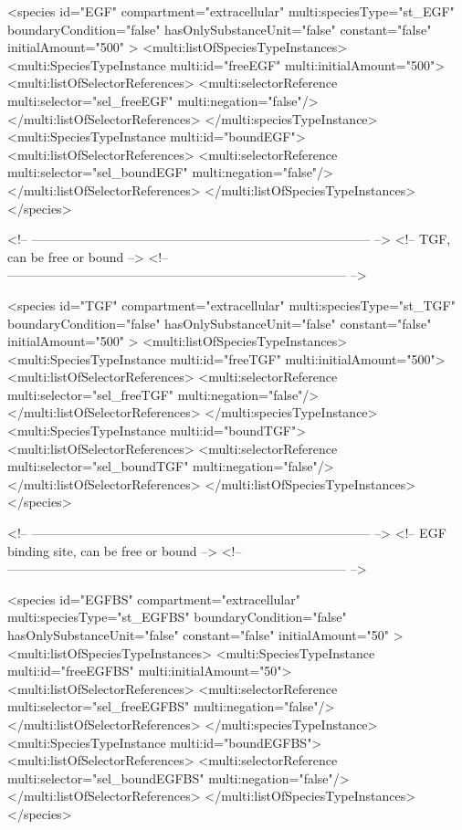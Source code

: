 \begin{example}
      <species id="EGF" compartment="extracellular" multi:speciesType="st_EGF"
               boundaryCondition="false" hasOnlySubstanceUnit="false" 
               constant="false" initialAmount="500" >
        <multi:listOfSpeciesTypeInstances>
          <multi:SpeciesTypeInstance multi:id="freeEGF" multi:initialAmount="500">
            <multi:listOfSelectorReferences>
              <multi:selectorReference multi:selector="sel_freeEGF" multi:negation="false"/>
            </multi:listOfSelectorReferences>
          </multi:speciesTypeInstance>
          <multi:SpeciesTypeInstance multi:id="boundEGF">
            <multi:listOfSelectorReferences>
              <multi:selectorReference multi:selector="sel_boundEGF" multi:negation="false"/>
            </multi:listOfSelectorReferences>
        </multi:listOfSpeciesTypeInstances>
      </species>

<!-- -------------------------------------------------------------------------------- -->
<!-- TGF, can be free or bound                                                        -->
<!-- -------------------------------------------------------------------------------- -->

     <species id="TGF" compartment="extracellular" multi:speciesType="st_TGF"
               boundaryCondition="false" hasOnlySubstanceUnit="false" 
               constant="false" initialAmount="500" >
        <multi:listOfSpeciesTypeInstances>
          <multi:SpeciesTypeInstance multi:id="freeTGF" multi:initialAmount="500">
            <multi:listOfSelectorReferences>
              <multi:selectorReference multi:selector="sel_freeTGF" multi:negation="false"/>
            </multi:listOfSelectorReferences>
          </multi:speciesTypeInstance>
          <multi:SpeciesTypeInstance multi:id="boundTGF">
            <multi:listOfSelectorReferences>
              <multi:selectorReference multi:selector="sel_boundTGF" multi:negation="false"/>
            </multi:listOfSelectorReferences>
        </multi:listOfSpeciesTypeInstances>
      </species>

<!-- -------------------------------------------------------------------------------- -->
<!-- EGF binding site, can be free or bound                                           -->
<!-- -------------------------------------------------------------------------------- -->

      <species id="EGFBS" compartment="extracellular" multi:speciesType="st_EGFBS"
               boundaryCondition="false" hasOnlySubstanceUnit="false" 
               constant="false" initialAmount="50" >
        <multi:listOfSpeciesTypeInstances>
          <multi:SpeciesTypeInstance multi:id="freeEGFBS" multi:initialAmount="50">
            <multi:listOfSelectorReferences>
              <multi:selectorReference multi:selector="sel_freeEGFBS" multi:negation="false"/>
            </multi:listOfSelectorReferences>
          </multi:speciesTypeInstance>
          <multi:SpeciesTypeInstance multi:id="boundEGFBS">
            <multi:listOfSelectorReferences>
              <multi:selectorReference multi:selector="sel_boundEGFBS" multi:negation="false"/>
            </multi:listOfSelectorReferences>
        </multi:listOfSpeciesTypeInstances>
      </species>


\end{example}
